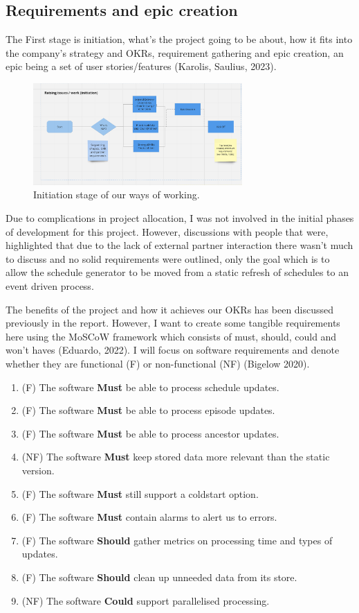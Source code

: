 \subsection{Requirements and epic creation}
  The First stage is initiation, what's the project going to be about, how it fits into the company's strategy and OKRs, requirement gathering 
  and epic creation, an epic being a set of user stories/features (Karolis, Saulius, 2023).

  \begin{figure}[H]
    \centering
    \includegraphics[width=8cm]{assets/workflow/initiate.png}
    \caption{Initiation stage of our ways of working.}
    \label{fig:workflowInitiate}
  \end{figure}

  Due to complications in project allocation, I was not involved in the initial phases of development for this project. However, discussions with 
  people that were, highlighted that due to the lack of external partner interaction there wasn't much to discuss and no solid requirements were 
  outlined, only the goal which is to allow the schedule generator to be moved from a static refresh of schedules to an event driven process.

  The benefits of the project and how it achieves our OKRs has been discussed previously in the report. However, I want to create some tangible
  requirements here using the MoSCoW framework which consists of must, should, could and won't haves (Eduardo, 2022). I will focus on software requirements and 
  denote whether they are functional (F) or non-functional (NF) (Bigelow 2020).

  \begin{enumerate}
    \item (F) The software \textbf{Must} be able to process schedule updates. 
    \item (F) The software \textbf{Must} be able to process episode updates.
    \item (F) The software \textbf{Must} be able to process ancestor updates.
    \item (NF) The software \textbf{Must} keep stored data more relevant than the static version.
    \item (F) The software \textbf{Must} still support a coldstart option.
    \item (F) The software \textbf{Must} contain alarms to alert us to errors.
    \item (F) The software \textbf{Should} gather metrics on processing time and types of updates.
    \item (F) The software \textbf{Should} clean up unneeded data from its store.
    \item (NF) The software \textbf{Could} support parallelised processing.
  \end{enumerate}

